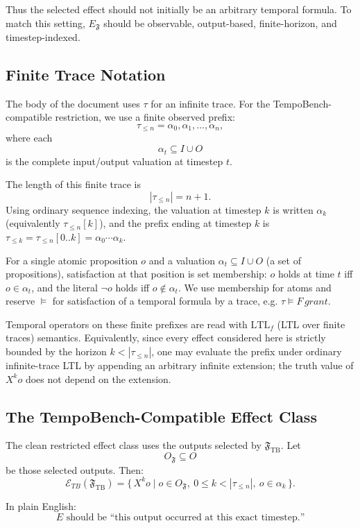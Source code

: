 \documentclass[11pt]{article}
\theoremstyle{remark}
\newcommand{\LTLf}{\mathrm{LTL}_f}
\newcommand{\Frame}{\mathfrak{F}}
\begin{document}
Thus the selected effect should not initially be an arbitrary temporal formula.
To match this setting, \(E_{\Frame}\) should be observable, output-based,
finite-horizon, and timestep-indexed.

\subsection{Finite Trace Notation}

The body of the document uses \(\tau\) for an infinite trace. For the
TempoBench-compatible restriction, we use a finite observed prefix:
\[
  \tau_{\le n}=\alpha_0,\alpha_1,\ldots,\alpha_n,
\]
where each
\[
  \alpha_t\subseteq I\cup O
\]
is the complete input/output valuation at timestep \(t\).

The length of this finite trace is
\[
  |\tau_{\le n}|=n+1.
\]
Using ordinary sequence indexing, the valuation at timestep \(k\) is written
\(\alpha_k\) (equivalently \(\tau_{\le n}[k]\)), and the prefix ending at
timestep \(k\) is \(\tau_{\le k}=\tau_{\le n}[0..k]=\alpha_0\cdots\alpha_k\).

For a single atomic proposition \(o\) and a valuation \(\alpha_t\subseteq I\cup O\)
(a set of propositions), satisfaction at that position is set membership: \(o\)
holds at time \(t\) iff \(o\in\alpha_t\), and the literal \(\neg o\) holds iff
\(o\notin\alpha_t\). We use membership for atoms and reserve \(\models\) for
satisfaction of a temporal formula by a trace, e.g. \(\tau\models F\,grant\).

Temporal operators on these finite prefixes are read with \(\LTLf\) (LTL over
finite traces) semantics. Equivalently, since every effect considered here is
strictly bounded by the horizon \(k<|\tau_{\le n}|\), one may evaluate the
prefix under ordinary infinite-trace LTL by appending an arbitrary infinite
extension; the truth value of \(X^k o\) does not depend on the extension.

\subsection{The TempoBench-Compatible Effect Class}

The clean restricted effect class uses the outputs selected by
\(\Frame_{\mathrm{TB}}\). Let
\[
  O_{\Frame}\subseteq O
\]
be those selected outputs. Then:
\[
  \mathcal{E}_{TB}(\Frame_{\mathrm{TB}})
  =
  \{\,X^k o
  \mid
  o\in O_{\Frame},\ 0\leq k<|\tau_{\le n}|,\ 
  o\in\alpha_k\,\}.
\]

In plain English:
\[
\boxed{
  E \text{ should be ``this output occurred at this exact timestep.''}
}
\]
\end{document}
